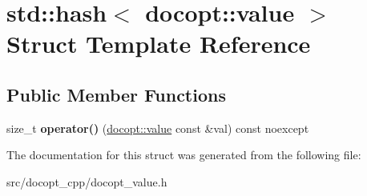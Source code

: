 \hypertarget{structstd_1_1hash_3_01docopt_1_1value_01_4}{}\section{std\+:\+:hash$<$ docopt\+:\+:value $>$ Struct Template Reference}
\label{structstd_1_1hash_3_01docopt_1_1value_01_4}
\subsection*{Public Member Functions}
\begin{DoxyCompactItemize}
\item 
\mbox{\label{structstd_1_1hash_3_01docopt_1_1value_01_4_a3d690e1e9edef071672b61878a5e1ff2}} 
size\+\_\+t {\bfseries operator()} (\hyperlink{structdocopt_1_1value}{docopt\+::value} const \&val) const noexcept
\end{DoxyCompactItemize}


The documentation for this struct was generated from the following file\+:\begin{DoxyCompactItemize}
\item 
src/docopt\+\_\+cpp/docopt\+\_\+value.\+h\end{DoxyCompactItemize}
